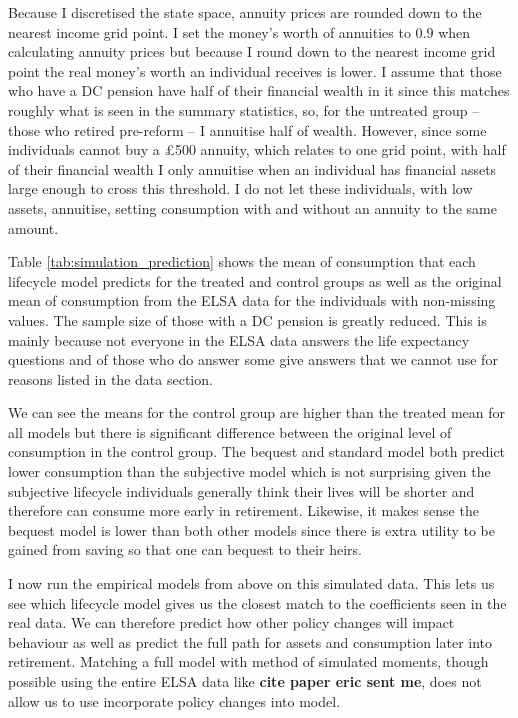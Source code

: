 \documentclass[12pt]{article}
\begin{document}
Because I discretised the state space, annuity prices are rounded down to the
nearest income grid point. I set the money's worth of annuities to $0.9$ when
calculating annuity prices but because I round down to the nearest income grid
point the real money's worth an individual receives is lower. I assume that
those who have a DC pension have half of their financial wealth in it since this
matches roughly what is seen in the summary statistics, so, for the untreated
group -- those who retired pre-reform -- I annuitise half of wealth. However,
since some individuals cannot buy a £500 annuity, which relates to one grid
point, with half of their financial wealth I only annuitise when an individual
has financial assets large enough to cross this threshold. I do not let these
individuals, with low assets, annuitise, setting consumption with and without an
annuity to the same amount.




Table \ref{tab:simulation_prediction} shows the mean of consumption that each
lifecycle model predicts for the treated and control groups as well as the
original mean of consumption from the ELSA data for the individuals with
non-missing values. The sample size of those with a DC pension is greatly
reduced. This is mainly because not everyone in the ELSA data answers the life
expectancy questions and of those who do answer some give answers that we cannot
use for reasons listed in the data section.

We can see the means for the control group are higher than the treated mean for
all models but there is significant difference between the original level of
consumption in the control group. The bequest and standard model both predict
lower consumption than the subjective model which is not surprising given the
subjective lifecycle individuals generally think their lives will be shorter and
therefore can consume more early in retirement. Likewise, it makes sense the
bequest model is lower than both other models since there is extra utility to be
gained from saving so that one can bequest to their heirs.

I now run the empirical models from above on this simulated data. This lets us
see which lifecycle model gives us the closest match to the coefficients seen in the
real data. We can therefore predict how other policy changes will impact
behaviour as well as predict the full path for assets and consumption later into
retirement. Matching a full model with method of simulated moments, though
possible using the entire ELSA data like \textbf{cite paper eric sent me}, does
not allow us to use incorporate policy changes into model.
\end{document}
